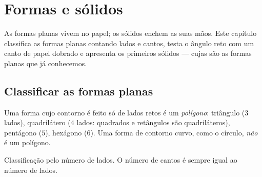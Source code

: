 \chapter{Formas e sólidos}\label{ch:g2:shapes}

As formas planas vivem no papel; os sólidos enchem as suas mãos.
Este capítulo classifica as formas planas contando lados e cantos,
testa o ângulo reto com um canto de papel dobrado e apresenta os
primeiros sólidos --- cujas  são as formas planas que já
conhecemos.

\section{Classificar as formas planas}

\begin{definition}\label{def:g2:shapes:sort}
Uma forma cujo contorno é feito só de lados retos é um
\emph{polígono}: triângulo ($3$ lados), quadrilátero ($4$ lados:
quadrados e retângulos são quadriláteros), pentágono ($5$),
hexágono ($6$). Uma forma de contorno curvo, como o círculo,
\emph{não} é um polígono.
\end{definition}

\begin{omfigure}

{\small Classificação pelo número de lados. O número de cantos é
sempre igual ao número de lados.}
\end{omfigure}

